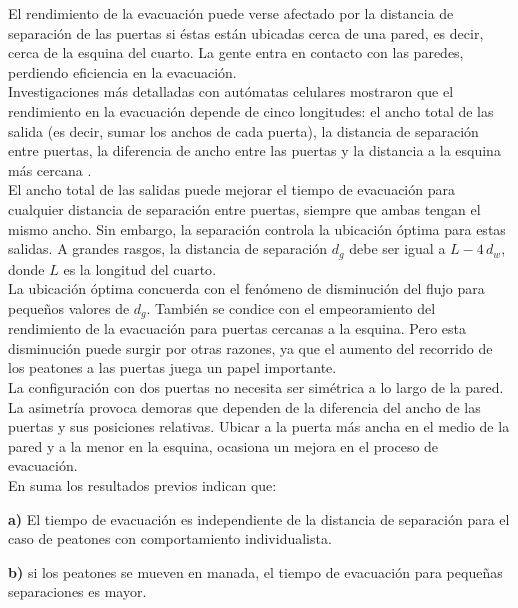 \noindent El rendimiento de la evacuación puede verse afectado por la distancia de separación de las puertas si éstas están ubicadas cerca de una pared, es decir, cerca de la esquina del cuarto. La gente entra en contacto con las paredes, perdiendo eficiencia en la evacuación\cite{kirchner1,daoliang1}. \\

\noindent Investigaciones más detalladas con autómatas celulares mostraron que el rendimiento en la evacuación depende de cinco longitudes: el ancho total de las salida (es decir, sumar los anchos de cada puerta), la distancia de separación entre puertas, la diferencia de ancho entre las puertas y la distancia a la esquina más cercana \cite{huanhuan1}. \\

\noindent El ancho total de las salidas puede mejorar el tiempo de evacuación para cualquier distancia de separación entre puertas, siempre que ambas tengan el mismo ancho. 
Sin embargo, la separación controla la ubicación óptima para
estas salidas. A grandes rasgos, la distancia de separación $d_g$ debe ser igual a $L-4\,d_w$, donde $L$ es la longitud del cuarto\cite{huanhuan1}. \\

\noindent La ubicación óptima concuerda con el fenómeno de disminución del flujo para pequeños valores de $d_g$. También se condice con el empeoramiento del rendimiento de la evacuación para puertas cercanas a la esquina. Pero esta disminución puede surgir por otras razones, ya que el aumento del recorrido de los peatones a las puertas juega un papel importante.\\ 

\noindent La configuración con dos puertas no necesita ser simétrica a lo largo de la pared. La asimetría provoca demoras que dependen de la diferencia del ancho de las puertas y sus posiciones relativas. Ubicar a la puerta más ancha en el medio de la pared y a la menor en la esquina, ocasiona un mejora en el proceso de evacuación\cite{huanhuan1}.\\

En suma los resultados previos indican que:

\forceindent \textbf{a)} El tiempo de evacuación es independiente de la distancia de separación para el caso de peatones con comportamiento individualista.

\forceindent \textbf{b)} si los peatones se mueven en manada, el tiempo de evacuación para pequeñas separaciones es mayor. 

